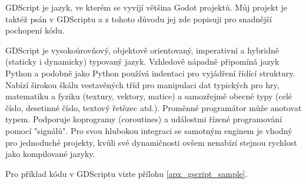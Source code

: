 GDScript je jazyk, ve kterém se vyvíjí většina Godot projektů. Můj projekt je taktéž psán v GDScriptu a z tohoto důvodu jej zde popisuji pro snadnější pochopení kódu.

GDScript je vysokoúrovňový, objektově orientovaný, imperativní a hybridně (staticky i dynamicky) typovaný jazyk. Vzhledově nápadně připomíná jazyk Python a podobně jako Python používá indentaci pro vyjádření řídící struktury. Nabízí širokou škálu vestavěných tříd pro manipulaci dat typických pro hry, matematiku a fyziku (textury, vektory, matice) a samozřejmě obecné typy (celé číslo, desetinné číslo, textový řetězec atd.). Proměnné programátor může anotovat typem. Podporuje koprogramy (coroutines) a událostmi řízené programování pomocí "signálů". Pro svou hlubokou integraci se samotným enginem je vhodný pro jednoduché projekty, kvůli své dynamičnosti ovšem nenabízí stejnou rychlost jako kompilované jazyky. \cite{gdscript_reference}

Pro příklad kódu v GDScriptu vizte přílohu \ref{apx_gscript_sample}.